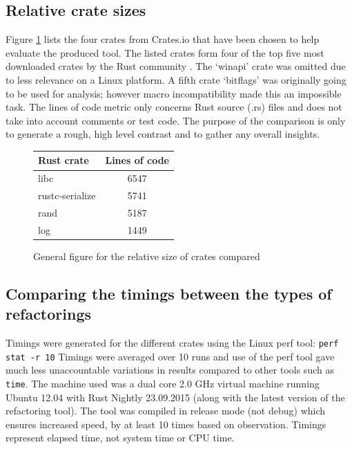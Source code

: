\subsection{Relative crate sizes}
Figure \ref{Fig:codesize} lists the four crates from Crates.io that have been chosen to help evaluate the produced tool. The listed crates form four of the top five most downloaded crates by the Rust community \cite{cratesio15}. The `winapi' crate was omitted due to less relevance on a Linux platform. A fifth crate `bitflags' was originally going to be used for analysis; however macro incompatibility made this an impossible task. The lines of code metric only concerns Rust source (.rs) files and does not take into account comments or test code. The purpose of the comparison is only to generate a rough, high level contrast and to gather any overall insights. 

\begin{figure}[H]
\begin{center}
    \begin{tabular}{ | l | c |}
    \hline
    \textbf{Rust crate} & \textbf{Lines of code} \\ \hline
    libc & 6547 \\ \hline
    rustc-serialize &  5741 \\ \hline
    rand &   5187 \\ \hline
    log &  1449 \\ \hline
    \end{tabular}
\end{center}

\caption{General figure for the relative size of crates compared}
\label{Fig:codesize}
\end{figure}


\subsection{Comparing the timings between the types of refactorings}
Timings were generated for the different crates using the Linux perf tool: {\verb|perf stat -r 10|} Timings were averaged over 10 runs and use of the perf tool gave much less unaccountable variations in results compared to other tools such as {\verb|time|}. The machine used was a dual core 2.0 GHz virtual machine running Ubuntu 12.04 with Rust Nightly 23.09.2015 (along with the latest version of the refactoring tool). The tool was compiled in release mode (not debug) which ensures increased speed, by at least 10 times based on observation. Timings represent elapsed time, not system time or CPU time.

